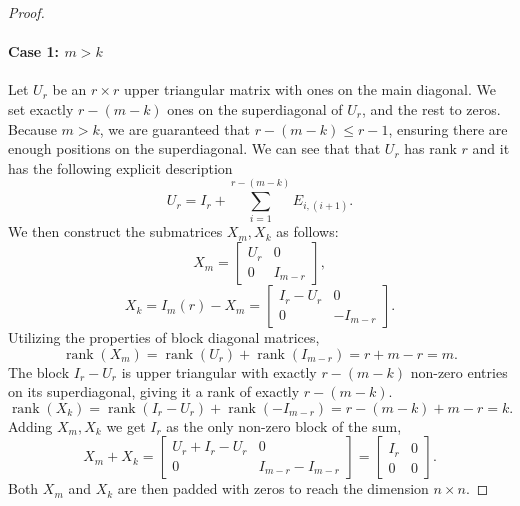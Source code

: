 \documentclass[10pt,a4paper]{amsart}
\DeclareMathOperator{\rank}{rank}
\begin{document}
\begin{proof}
    \paragraph{Case 1: $m>k$}
    Let $U_r$ be an $r\times r$ upper triangular matrix with ones on the main diagonal. We set exactly $r - (m-k)$ ones on the superdiagonal of $U_r$, and the rest to zeros. Because $m > k$, we are guaranteed that $r - (m-k) \le r-1$, ensuring there are enough positions on the superdiagonal. We can see that  that $U_r$ has rank $r$ and it has the following explicit description 
    \[U_r = I_r +\sum_{i=1}^{r - (m-k)} E_{i,(i+1)}.\]
    We then construct the submatrices $X_m,X_k$ as follows:
    \[
    X_m =
    \begin{bmatrix}
        U_r & 0\\
        0 & I_{m-r}
    \end{bmatrix},
    \]
    \[
    X_k = I_m(r) - X_m =
    \begin{bmatrix}
        I_r-U_r & 0\\
        0 & -I_{m-r}
    \end{bmatrix}.
    \]
    Utilizing the properties of block diagonal matrices,
    \[\rank(X_m) = \rank(U_r) + \rank(I_{m-r}) = r+m-r=m.\]
    The block $I_r - U_r$ is  upper triangular with exactly $r - (m-k)$ non-zero entries on its superdiagonal, giving it a rank of exactly $r - (m-k)$. 
    \[\rank(X_k) = \rank(I_r - U_r) + \rank(-I_{m-r}) = r - (m-k)+m-r=k.\]
    Adding $X_m,X_k$ we get $I_r$ as the only non-zero block of the sum,
    \[
    X_m + X_k =
    \begin{bmatrix}
        U_r + I_r - U_r & 0\\
        0 & I_{m-r} - I_{m-r}
    \end{bmatrix}
    =
    \begin{bmatrix}
        I_r& 0\\
        0 & 0
    \end{bmatrix}.
    \]
    Both $X_m$ and $X_k$ are then padded with zeros to reach the dimension $n\times n$.


\end{proof}
\end{document}
